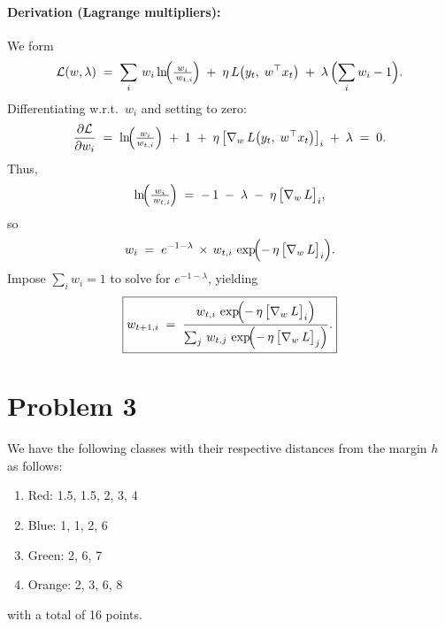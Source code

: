 \documentclass{article}
\begin{document}
\paragraph{Derivation (Lagrange multipliers):}
We form
\[
  \mathcal{L}(w,\lambda)
  \;=\;
  \sum_{i}\,
    w_i \ln\!\Bigl(\tfrac{w_i}{\,w_{t,i}\!}\Bigr)
  \;+\;
  \eta\,L\bigl(y_t,\;w^\top x_t\bigr)
  \;+\;
  \lambda\,\Bigl(\sum_{i} w_i - 1\Bigr).
\]
Differentiating w.r.t.\ $w_i$ and setting to zero:
\[
  \frac{\partial \mathcal{L}}{\partial w_i}
  \;=\;
  \ln\!\Bigl(\tfrac{w_i}{w_{t,i}}\Bigr)
  \;+\;
  1
  \;+\;
  \eta \,\bigl[\nabla_w\,L\bigl(y_t,\;w^\top x_t\bigr)\bigr]_i
  \;+\;
  \lambda 
  \;=\;0.
\]
Thus,
\[
  \ln\!\Bigl(\tfrac{w_i}{\,w_{t,i}\!}\Bigr)
  \;=\;
  -\,1 \;-\;\lambda
  \;-\;\eta\,\bigl[\nabla_w\,L\bigr]_i,
\]
so
\[
  w_i
  \;=\;
  e^{-1-\lambda}
  \,\times\,
  w_{t,i}
  \,\exp\!\Bigl(-\,\eta\,\bigl[\nabla_w\,L\bigr]_i\Bigr).
\]
Impose $\sum_i w_i=1$ to solve for $e^{-1-\lambda}$, yielding
\[
  \boxed{
  w_{t+1,i}
  \;=\;
  \frac{
    w_{t,i}\,\exp\!\Bigl(-\,\eta\,\bigl[\nabla_w\,L\bigr]_i\Bigr)
  }{
    \sum_{j}\,
      w_{t,j}\,\exp\!\Bigl(-\,\eta\,\bigl[\nabla_w\,L\bigr]_j\Bigr)
  }.
  }
\]

\section*{Problem 3}

We have the following classes with their respective distances from the margin $h$ as follows:
\begin{enumerate}
    \item Red: 1.5, 1.5, 2, 3, 4
    \item Blue: 1, 1, 2, 6
    \item Green: 2, 6, 7
    \item Orange: 2, 3, 6, 8
\end{enumerate}
with a total of 16 points.\\
\end{document}
